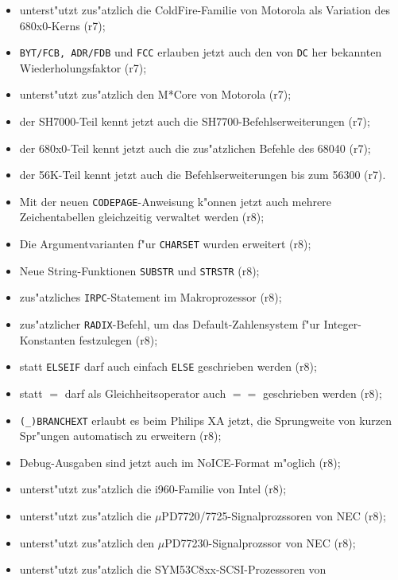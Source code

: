 \documentclass[12pt,a4paper,twoside]{report}
\newcommand{\tty}[1]{{\tt #1}}
\newcommand{\predefsym}[1]{{\tt (\_)#1}}
\begin{document}
\begin{itemize}
{\begin{itemize}
{            Startadresse voranstellen (r7);}
      \item{unterst"utzt zus"atzlich die ColdFire-Familie von Motorola als
            Variation des 680x0-Kerns (r7);}
      \item{\tty{BYT/FCB, ADR/FDB} und \tty{FCC} erlauben jetzt auch den
            von \tty{DC} her bekannten Wiederholungsfaktor (r7);}
      \item{unterst"utzt zus"atzlich den M*Core von Motorola (r7);}
      \item{der SH7000-Teil kennt jetzt auch die SH7700-Befehlserweiterungen
            (r7);}
      \item{der 680x0-Teil kennt jetzt auch die zus"atzlichen Befehle des
            68040 (r7);}
      \item{der 56K-Teil kennt jetzt auch die Befehlserweiterungen bis zum
            56300 (r7).}
      \item{Mit der neuen \tty{CODEPAGE}-Anweisung k"onnen jetzt auch
            mehrere Zeichentabellen gleichzeitig verwaltet werden (r8);}
      \item{Die Argumentvarianten f"ur \tty{CHARSET} wurden erweitert
            (r8);}
      \item{Neue String-Funktionen \tty{SUBSTR} und \tty{STRSTR} (r8);}
      \item{zus"atzliches \tty{IRPC}-Statement im Makroprozessor (r8);}
      \item{zus"atzlicher {\tt RADIX}-Befehl, um das Default-Zahlensystem
            f"ur Integer-Konstanten festzulegen (r8);}
      \item{statt {\tt ELSEIF} darf auch einfach {\tt ELSE} geschrieben
            werden (r8);}
      \item{statt $=$ darf als Gleichheitsoperator auch $==$ geschrieben
            werden (r8);}
      \item{\predefsym{BRANCHEXT} erlaubt es beim Philips XA jetzt, die
            Sprungweite von kurzen Spr"ungen automatisch zu erweitern
            (r8);}
      \item{Debug-Ausgaben sind jetzt auch im NoICE-Format m"oglich (r8);}
      \item{unterst"utzt zus"atzlich die i960-Familie von Intel (r8);}
      \item{unterst"utzt zus"atzlich die $\mu$PD7720/7725-Signalprozssoren
            von NEC (r8);}
      \item{unterst"utzt zus"atzlich den $\mu$PD77230-Signalprozssor von
            NEC (r8);}
      \item{unterst"utzt zus"atzlich die SYM53C8xx-SCSI-Prozessoren von
}
\end{itemize}}
\end{itemize}
\end{document}

